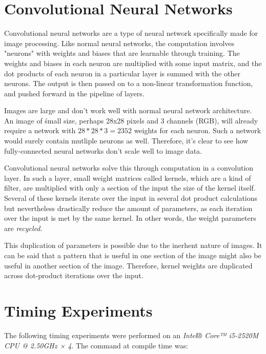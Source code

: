 \documentclass[12pt]{report}
\begin{document}
\section{Convolutional Neural Networks}
Convolutional neural networks are a type of neural network specifically made for image processing. Like normal neural networks, the computation involves "neurons" with weights and biases that are learnable through training. The weights and biases in each neuron are multiplied with some input matrix, and the dot products of each neuron in a particular layer is summed with the other neurons. The output is then passed on to a non-linear transformation function, and pushed forward in the pipeline of layers.

Images are large and don't work well with normal neural network architecture. An image of śmall size, perhaps 28x28 pixels and 3 channels (RGB), will already require a network with \begin{math}28*28*3 = 2352\end{math} weights for each neuron. Such a network would surely contain mutliple neurons as well. Therefore, it's clear to see how fully-connected neural networks don't scale well to image data.

Convolutional neural networks solve this through computation in a convolution layer. In such a layer, small weight matrices called kernels, which are a kind of filter, are multiplied with only a section of the input the size of the kernel itself. Several of these kernels iterate over the input in several dot product calculations but nevertheless drastically reduce the amount of parameters, as each iteration over the input is met by the same kernel. In other words, the weight parameters are \textit{recycled}.

This duplication of parameters is possible due to the inerhent nature of images. It can be said that a pattern that is useful in one section of the image might also be useful in another section of the image. Therefore, kernel weights are duplicated across dot-product iterations over the input.










\section{Timing Experiments}
The following timing experiments were performed on an \textit{Intel® Core™ i5-2520M CPU @ 2.50GHz × 4}. The command at compile time was: 
\end{document}
